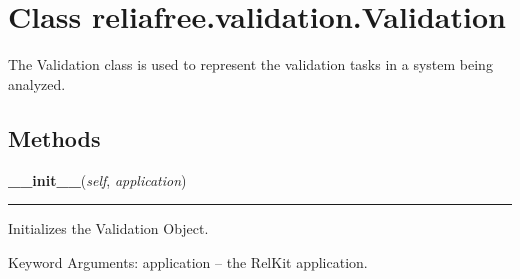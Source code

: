 %
%
%


\section{Class reliafree.validation.Validation}

    \label{reliafree:validation:Validation}
The Validation class is used to represent the validation tasks in a system 
being analyzed.



  \subsection{Methods}

    \label{reliafree:validation:Validation:__init__}

    \vspace{0.5ex}

\hspace{.8\funcindent}\begin{boxedminipage}{\funcwidth}

    \raggedright \textbf{\_\_init\_\_}(\textit{self}, \textit{application})

    \vspace{-1.5ex}

    \rule{\textwidth}{0.5\fboxrule}
\setlength{\parskip}{2ex}
    Initializes the Validation Object.

    Keyword Arguments: application -- the RelKit application.

\setlength{\parskip}{1ex}
    \end{boxedminipage}

